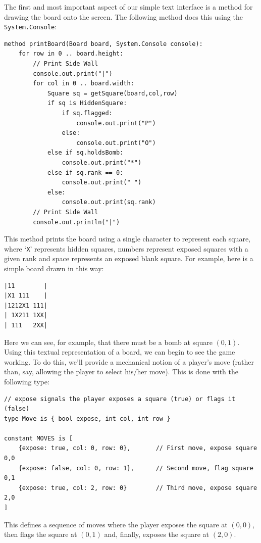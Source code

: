 The first and most important aspect of our simple text interface is a method for drawing the board onto the screen.  The following method does this using the \lstinline{System.Console}:
\begin{lstlisting}
method printBoard(Board board, System.Console console):
    for row in 0 .. board.height:
        // Print Side Wall
        console.out.print("|")
        for col in 0 .. board.width:
            Square sq = getSquare(board,col,row)
            if sq is HiddenSquare:
                if sq.flagged:
                    console.out.print("P")
                else:
                    console.out.print("O")
            else if sq.holdsBomb:
                console.out.print("*")
            else if sq.rank == 0:
                console.out.print(" ")
            else:
                console.out.print(sq.rank)
        // Print Side Wall
        console.out.println("|")
\end{lstlisting} 

This method prints the board using a single character to represent each square, where `\verb+X+' represents hidden squares, numbers represent exposed squares with a given rank and space represents an exposed blank square.  For example, here is a simple board drawn in this way:
\begin{lstlisting}
|11        |
|X1 111    |
|1212X1 111|
| 1X211 1XX|
| 111   2XX|
\end{lstlisting}
Here we can see, for example, that there must be a bomb at square $(0,1)$.  Using this textual representation of a board, we can begin to see the game working.  To do this, we'll provide a mechanical notion of a player's move (rather than, say, allowing the player to select his/her move).  This is done with the following type:
\begin{lstlisting}
// expose signals the player exposes a square (true) or flags it (false)
type Move is { bool expose, int col, int row }
        
constant MOVES is [
    {expose: true, col: 0, row: 0},       // First move, expose square 0,0
    {expose: false, col: 0, row: 1},      // Second move, flag square 0,1
    {expose: true, col: 2, row: 0}        // Third move, expose square 2,0
]
\end{lstlisting}

This defines a sequence of moves where the player exposes the square at $(0,0)$, then flags the square at $(0,1)$ and, finally, exposes the square at $(2,0)$.

